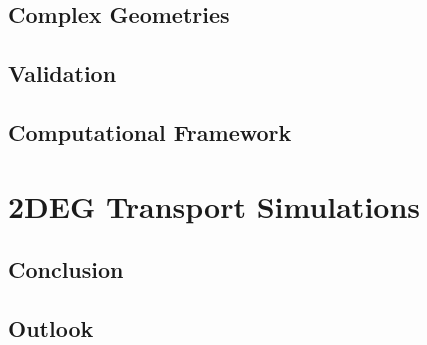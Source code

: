 \section{Complex Geometries}

\section{Validation}\label{sec:validation}

\section{Computational Framework}

\chapter{2DEG Transport Simulations}

\section{Conclusion}
\section{Outlook}
\appendix

\clearpage



